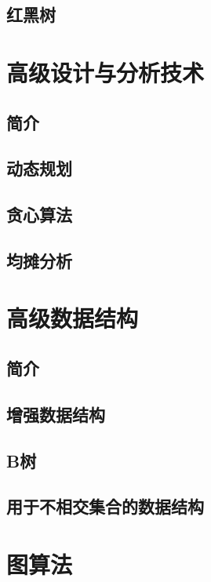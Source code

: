 \documentclass[lang=cn,newtx,10pt,scheme=chinese]{elegantbook}
\begin{document}
\chapter{红黑树}\label{chapter-13}

\part{高级设计与分析技术}

\chapter*{简介}

\chapter{动态规划}\label{chapter-14}

\chapter{贪心算法}\label{chapter-15}

\chapter{均摊分析}\label{chapter-16}

\part{高级数据结构}

\chapter*{简介}

\chapter{增强数据结构}\label{chapter-17}

\chapter{B树}\label{chapter-18}

\chapter{用于不相交集合的数据结构}\label{chapter-19}

\part{图算法}
\end{document}
